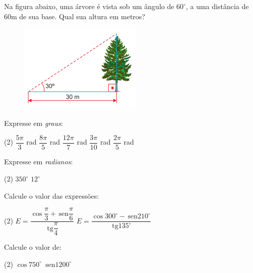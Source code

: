 \documentclass[a4paper,11pt,addpoints]{exam}
\providecommand{\sin}{} \renewcommand{\sin}{\hspace{2pt}\mathrm{sen}}
\providecommand{\tan}{} \renewcommand{\tan}{\hspace{2pt}\mathrm{tg}}
\begin{document}
\begin{questions}
	\question[2]

	Na figura abaixo, uma árvore é vista sob um ângulo de $60^\circ$, a uma distância de $60$m de sua base. Qual sua altura em metros?
	\begin{figure}[H]
		\centering
		\includegraphics[width=.4\linewidth]{figures/1.png}
	\end{figure}

	\question[2]

	Expresse em \textit{graus}:

	\begin{tasks}(2)
		\task $\dfrac{5\pi}{3}$ rad
		\task $\dfrac{8\pi}{5}$ rad
		\task $\dfrac{12\pi}{7}$ rad
		\task $\dfrac{3\pi}{10}$ rad
		\task $\dfrac{2\pi}{5}$ rad
	\end{tasks}

	\question[2]

	Expresse em \textit{radianos}:

	\begin{tasks}(2)
		\task $350^\circ$
		\task $12^\circ$
	\end{tasks}

	\question[2]

	Calcule o valor das expressões:

	\begin{tasks}(2)
		\task $E = \dfrac{\cos \dfrac{\pi}{3} + \sin \dfrac{\pi}{6}}{\tan \dfrac{\pi}{4}}$
		\task $E = \dfrac{\cos 300^\circ - \sin 210^\circ}{\tan 135^\circ}$
	\end{tasks}

	\question[2]

	Calcule o valor de:

	\begin{tasks}(2)
		\task $\cos 750^\circ$
		\task $\sin 1200^\circ$
	\end{tasks}

\end{questions}
\end{document}
